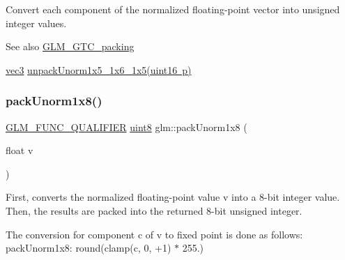 Convert each component of the normalized floating-\/point vector into unsigned integer values.

\begin{DoxySeeAlso}{See also}
\mbox{\hyperlink{group__gtc__packing}{G\+L\+M\+\_\+\+G\+T\+C\+\_\+packing}} 

\mbox{\hyperlink{group__core__types_ga1c47e8b3386109bc992b6c48e91b0be7}{vec3}} \mbox{\hyperlink{group__gtc__packing_ga6804d0525daf68bcac226f46fbb3b24e}{unpack\+Unorm1x5\+\_\+1x6\+\_\+1x5(uint16 p)}} 
\end{DoxySeeAlso}
\mbox{\label{group__gtc__packing_ga2f9963e5d762b10085b280d3662017ba}} 
\subsubsection{\texorpdfstring{pack\+Unorm1x8()}{packUnorm1x8()}}
{\footnotesize\ttfamily \mbox{\hyperlink{setup_8hpp_a33fdea6f91c5f834105f7415e2a64407}{G\+L\+M\+\_\+\+F\+U\+N\+C\+\_\+\+Q\+U\+A\+L\+I\+F\+I\+ER}} \mbox{\hyperlink{group__gtc__type__precision_ga1a7dcd8aac97cc8020817c94049deff2}{uint8}} glm\+::pack\+Unorm1x8 (\begin{DoxyParamCaption}\item[{float}]{v }\end{DoxyParamCaption})}

First, converts the normalized floating-\/point value v into a 8-\/bit integer value. Then, the results are packed into the returned 8-\/bit unsigned integer.

The conversion for component c of v to fixed point is done as follows\+: pack\+Unorm1x8\+: round(clamp(c, 0, +1) $\ast$ 255.)


